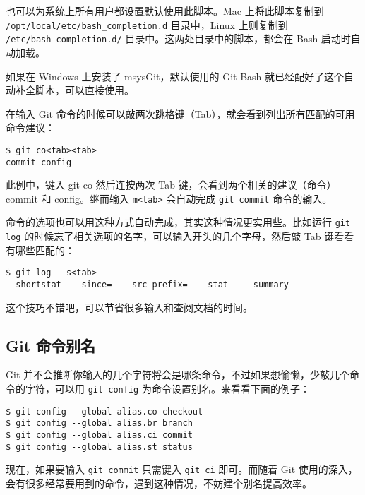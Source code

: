 \documentclass[a4paper]{book}
\newcounter{tab}[chapter]
\begin{document}
也可以为系统上所有用户都设置默认使用此脚本。Mac 上将此脚本复制到 \texttt{/opt/local/etc/bash\_completion.d} 目录中，Linux 上则复制到 \texttt{/etc/bash\_completion.d/} 目录中。这两处目录中的脚本，都会在 Bash 启动时自动加载。

如果在 Windows 上安装了 msysGit，默认使用的 Git Bash 就已经配好了这个自动补全脚本，可以直接使用。

在输入 Git 命令的时候可以敲两次跳格键（Tab），就会看到列出所有匹配的可用命令建议：

\begin{shaded}\begin{verbatim}
$ git co<tab><tab>
commit config
\end{verbatim}\end{shaded}

此例中，键入 git co 然后连按两次 Tab 键，会看到两个相关的建议（命令） commit 和 config。继而输入 \texttt{m\textless{}tab\textgreater{}} 会自动完成 \texttt{git commit} 命令的输入。

命令的选项也可以用这种方式自动完成，其实这种情况更实用些。比如运行 \texttt{git log} 的时候忘了相关选项的名字，可以输入开头的几个字母，然后敲 Tab 键看看有哪些匹配的：

\begin{shaded}\begin{verbatim}
$ git log --s<tab>
--shortstat  --since=  --src-prefix=  --stat   --summary
\end{verbatim}\end{shaded}

这个技巧不错吧，可以节省很多输入和查阅文档的时间。

\subsection{Git 命令别名}

Git 并不会推断你输入的几个字符将会是哪条命令，不过如果想偷懒，少敲几个命令的字符，可以用 \texttt{git config} 为命令设置别名。来看看下面的例子：

\begin{shaded}\begin{verbatim}
$ git config --global alias.co checkout
$ git config --global alias.br branch
$ git config --global alias.ci commit
$ git config --global alias.st status
\end{verbatim}\end{shaded}

现在，如果要输入 \texttt{git commit} 只需键入 \texttt{git ci} 即可。而随着 Git 使用的深入，会有很多经常要用到的命令，遇到这种情况，不妨建个别名提高效率。
\end{document}
